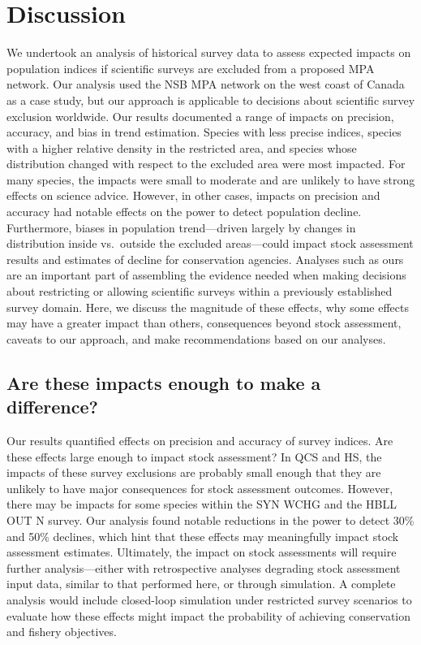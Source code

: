 \documentclass[12pt]{article}
\begin{document}
\section*{Discussion}

We undertook an analysis of historical survey data to assess expected impacts on population indices if scientific surveys are excluded from a proposed MPA network.
Our analysis used the NSB MPA network on the west coast of Canada as a case study, but our approach is applicable to decisions about scientific survey exclusion worldwide.
Our results documented a range of impacts on precision, accuracy, and bias in trend estimation.
Species with less precise indices, species with a higher relative density in the restricted area, and species whose distribution changed with respect to the excluded area were most impacted.
For many species, the impacts were small to moderate and are unlikely to have strong effects on science advice.
However, in other cases, impacts on precision and accuracy had notable effects on the power to detect population decline.
Furthermore, biases in population trend---driven largely by changes in distribution inside vs.\ outside the excluded areas---could impact stock assessment results and estimates of decline for conservation agencies.
Analyses such as ours are an important part of assembling the evidence needed when making decisions about restricting or allowing scientific surveys within a previously established survey domain.
Here, we discuss the magnitude of these effects, why some effects may have a greater impact than others, consequences beyond stock assessment, caveats to our approach, and make recommendations based on our analyses.

\subsection*{Are these impacts enough to make a difference?}

Our results quantified effects on precision and accuracy of survey indices.
Are these effects large enough to impact stock assessment?
In QCS and HS, the impacts of these survey exclusions are probably small enough that they are unlikely to have major consequences for stock assessment outcomes.
However, there may be impacts for some species within the SYN WCHG and the HBLL OUT N survey.
Our analysis found notable reductions in the power to detect 30\% and 50\% declines, which hint that these effects may meaningfully impact stock assessment estimates.
Ultimately, the impact on stock assessments will require further analysis---either with retrospective analyses degrading stock assessment input data, similar to that performed here, or through simulation.
A complete analysis would include closed-loop simulation \citep{smith1999, punt2016} under restricted survey scenarios to evaluate how these effects might impact the probability of achieving conservation and fishery objectives.
\end{document}
